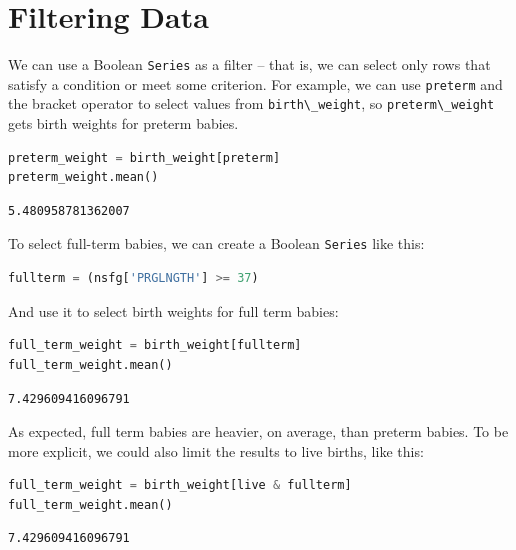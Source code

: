 \hypertarget{filtering-data}{%
\section{Filtering Data}\label{filtering-data}}

We can use a Boolean \passthrough{\lstinline!Series!} as a filter --
that is, we can select only rows that satisfy a condition or meet some
criterion. For example, we can use \passthrough{\lstinline!preterm!} and
the bracket operator to select values from
\passthrough{\lstinline!birth\_weight!}, so
\passthrough{\lstinline!preterm\_weight!} gets birth weights for preterm
babies.

\begin{lstlisting}[language=Python,style=source]
preterm_weight = birth_weight[preterm]
preterm_weight.mean()
\end{lstlisting}

\begin{lstlisting}[style=output]
5.480958781362007
\end{lstlisting}

To select full-term babies, we can create a Boolean
\passthrough{\lstinline!Series!} like this:

\begin{lstlisting}[language=Python,style=source]
fullterm = (nsfg['PRGLNGTH'] >= 37)
\end{lstlisting}

And use it to select birth weights for full term babies:

\begin{lstlisting}[language=Python,style=source]
full_term_weight = birth_weight[fullterm]
full_term_weight.mean()
\end{lstlisting}

\begin{lstlisting}[style=output]
7.429609416096791
\end{lstlisting}

As expected, full term babies are heavier, on average, than preterm
babies. To be more explicit, we could also limit the results to live
births, like this:

\begin{lstlisting}[language=Python,style=source]
full_term_weight = birth_weight[live & fullterm]
full_term_weight.mean()
\end{lstlisting}

\begin{lstlisting}[style=output]
7.429609416096791
\end{lstlisting}

